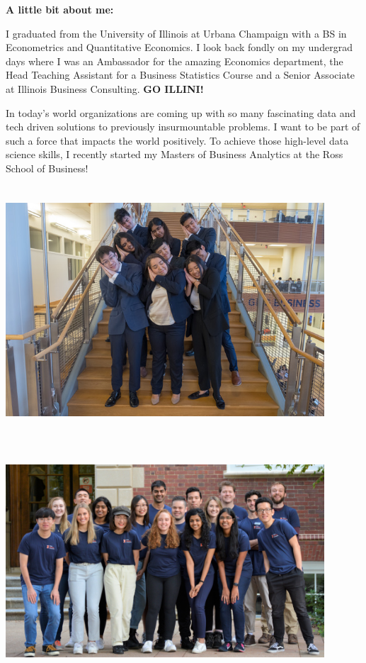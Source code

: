 \documentclass[
]{book}
\theoremstyle{definition}
\theoremstyle{definition}
\theoremstyle{definition}
\theoremstyle{definition}
\theoremstyle{remark}
\begin{document}
\textbf{A little bit about me:}

I graduated from the University of Illinois at Urbana Champaign with a BS in Econometrics and Quantitative Economics. I look back fondly on my undergrad days where I was an Ambassador for the amazing Economics department, the Head Teaching Assistant for a Business Statistics Course and a Senior Associate at Illinois Business Consulting. \textbf{GO ILLINI!}

In today's world organizations are coming up with so many fascinating data and tech driven solutions to previously insurmountable problems. I want to be part of such a force that impacts the world positively. To achieve those high-level data science skills, I recently started my Masters of Business Analytics at the Ross School of Business!

\includegraphics[width=4.6875in,height=3.64583in]{nikita3.jpeg} \includegraphics[width=4.6875in,height=3.64583in]{nikita2.png}
\end{document}
